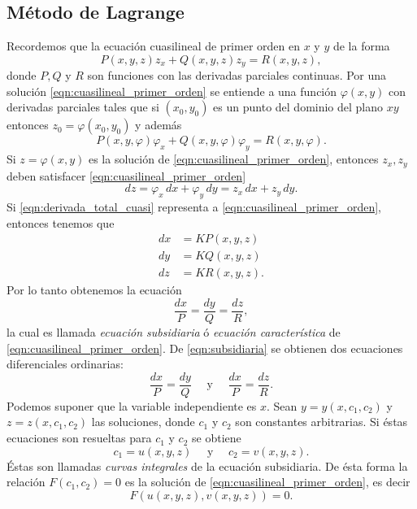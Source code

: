 \documentclass[11pt,letterpaper]{report}
\newcommand\<{\langle}
\renewcommand\>{\rangle}
\renewcommand\phi\varphi
\begin{document}
\subsection{Método de Lagrange}

Recordemos que la ecuación cuasilineal de primer orden en
$x$ y $y$ de la forma
\begin{equation}
  \label{eqn:cuasilineal_primer_orden}
  P(x,y,z) z_x + Q(x,y,z) z_y = R(x,y,z),
\end{equation}
donde $P, Q$ y $R$ son funciones con las derivadas parciales
continuas. Por una solución
\ref{eqn:cuasilineal_primer_orden} se entiende a una función
$\phi(x,y)$ con derivadas parciales tales que si $(x_0,y_0)$
es un punto del dominio del plano $xy$ entonces $z_0 =
\phi(x_0,y_0)$ y además
\[
P(x,y,\phi) \phi_x + Q(x,y,\phi) \phi_y = R(x,y,\phi).
\] 
Si $z = \phi(x,y)$ es la solución de
\ref{eqn:cuasilineal_primer_orden}, entonces $z_x, z_y$
deben satisfacer \ref{eqn:cuasilineal_primer_orden}
\begin{equation}
  \label{eqn:derivada_total_cuasi}
  dz = \phi_x \, dx + \phi_y \, dy = z_x \, dx + z_y \, dy.
\end{equation}
Si \ref{eqn:derivada_total_cuasi} representa a
\ref{eqn:cuasilineal_primer_orden}, entonces tenemos que
\begin{align*}
  dx &= KP(x,y,z)\\
  dy &= KQ(x,y,z)\\
  dz &= KR(x,y,z).
\end{align*}
Por lo tanto obtenemos la ecuación
\begin{equation}
  \label{eqn:subsidiaria}
  \frac{dx}{P} = \frac{dy}{Q} = \frac{dz}{R},
\end{equation}
la cual es llamada \textit{ecuación subsidiaria} ó
\textit{ecuación característica} de
\ref{eqn:cuasilineal_primer_orden}. De \ref{eqn:subsidiaria}
se obtienen dos ecuaciones diferenciales ordinarias:
\[
\frac{dx}{P} = \frac{dy}{Q} \quad \text{ y } \quad
\frac{dx}{P} = \frac{dz}{R}.
\] 
Podemos suponer que la variable independiente es $x$. Sean
$y = y(x,c_1,c_2)$ y
$z = z(x,c_1,c_2)$ las soluciones, donde
$c_1$ y $c_2$ son constantes arbitrarias. Si éstas
ecuaciones son resueltas para $c_1$ y $c_2$ se obtiene
\[
c_1 = u(x,y,z) \quad \text{ y } \quad c_2 = v(x,y,z).
\] 
Éstas son llamadas \textit{curvas integrales} de la ecuación
subsidiaria. De ésta forma la relación $F(c_1,c_2) = 0$ es
la solución
de \ref{eqn:cuasilineal_primer_orden}, es decir
\[
F(u(x,y,z), v(x,y,z))=0.
\] 
\end{document}
